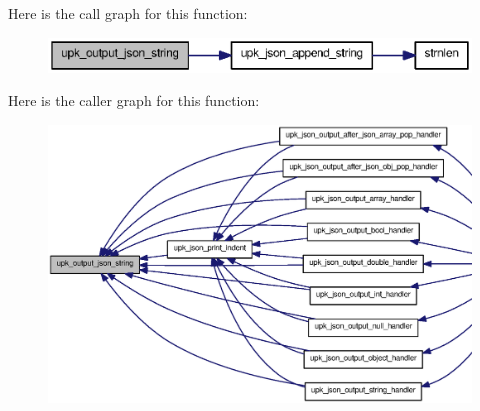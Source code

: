 Here is the call graph for this function:\nopagebreak
\begin{figure}[H]
\begin{center}
\leavevmode
\includegraphics[width=400pt]{upk__json_8c_a7778d21faa09208bfba7f29f8723153d_cgraph}
\end{center}
\end{figure}




Here is the caller graph for this function:\nopagebreak
\begin{figure}[H]
\begin{center}
\leavevmode
\includegraphics[width=400pt]{upk__json_8c_a7778d21faa09208bfba7f29f8723153d_icgraph}
\end{center}
\end{figure}


